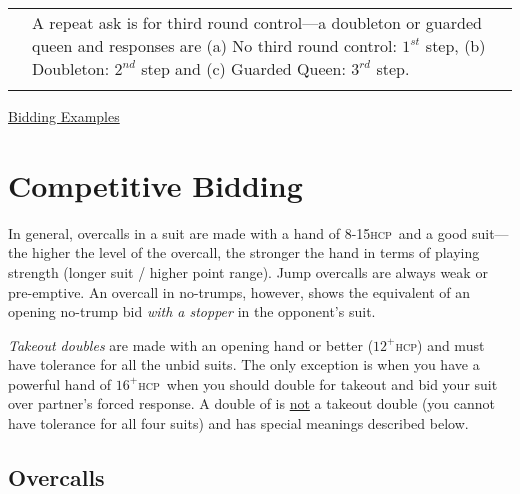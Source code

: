 \documentclass[a4paper,article,oneside]{memoir}
\newcommand{\hcp}{\textsc{hcp}}
\begin{document}
\begin{longtable}{p{1.5cm}p{9.5cm}}
\begin{tabular}{lp{6.5cm}}
                                      & A repeat ask is for third
                                        round control---a doubleton or
                                        guarded queen and responses
                                        are (a) No third round
                                        control: $1^{st}$ step, (b)
                                        Doubleton: $2^{nd}$ step and
                                        (c) Guarded Queen: $3^{rd}$
                                        step. \\
                 \end{tabular} \\
  \hline
\end{longtable}


\hyperlink{namyats}{Bidding Examples\HandCuffRight}

\section{Competitive Bidding}

In general, overcalls in a suit are made with a hand of 8-15\hcp\ and
a good suit---the higher the level of the overcall, the stronger the
hand in terms of playing strength (longer suit / higher point
range). Jump overcalls are always weak or pre-emptive. An overcall in
no-trumps, however, shows the equivalent of an opening no-trump bid
\emph{with a stopper} in the opponent's suit.

\emph{Takeout doubles} are made with an opening hand or better
($12^+$\hcp) and must have tolerance for all the unbid suits. The only
exception is when you have a powerful hand of $16^+$\hcp\ when you
should double for takeout and bid your suit over partner's forced
response. A double of  is \underline{not} a takeout double (you
cannot have tolerance for all four suits) and has special meanings
described below.

\subsection{Overcalls}
\end{document}
